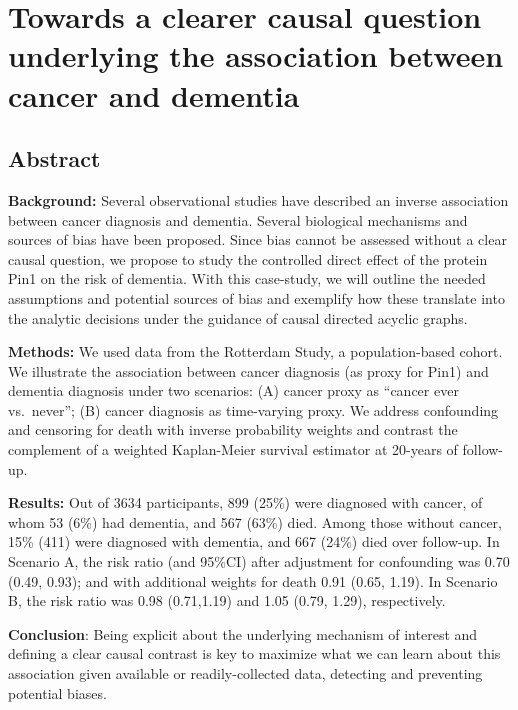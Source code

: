 \documentclass[
]{book}
\begin{document}
\hypertarget{chapter4}{%
\chapter{Towards a clearer causal question underlying the association between cancer and dementia}\label{chapter4}}

\hypertarget{abstract-2}{%
\section{Abstract}\label{abstract-2}}

\textbf{Background:} Several observational studies have described an inverse association between cancer diagnosis and dementia. Several biological mechanisms and sources of bias have been proposed. Since bias cannot be assessed without a clear causal question, we propose to study the controlled direct effect of the protein Pin1 on the risk of dementia. With this case-study, we will outline the needed assumptions and potential sources of bias and exemplify how these translate into the analytic decisions under the guidance of causal directed acyclic graphs.

\textbf{Methods:} We used data from the Rotterdam Study, a population-based cohort. We illustrate the association between cancer diagnosis (as proxy for Pin1) and dementia diagnosis under two scenarios: (A) cancer proxy as ``cancer ever vs.~never''; (B) cancer diagnosis as time-varying proxy. We address confounding and censoring for death with inverse probability weights and contrast the complement of a weighted Kaplan-Meier survival estimator at 20-years of follow-up.

\textbf{Results:} Out of 3634 participants, 899 (25\%) were diagnosed with cancer, of whom 53 (6\%) had dementia, and 567 (63\%) died. Among those without cancer, 15\% (411) were diagnosed with dementia, and 667 (24\%) died over follow-up. In Scenario A, the risk ratio (and 95\%CI) after adjustment for confounding was 0.70 (0.49, 0.93); and with additional weights for death 0.91 (0.65, 1.19). In Scenario B, the risk ratio was 0.98 (0.71,1.19) and 1.05 (0.79, 1.29), respectively.

\textbf{Conclusion}: Being explicit about the underlying mechanism of interest and defining a clear causal contrast is key to maximize what we can learn about this association given available or readily-collected data, detecting and preventing potential biases.

\newpage
\end{document}
